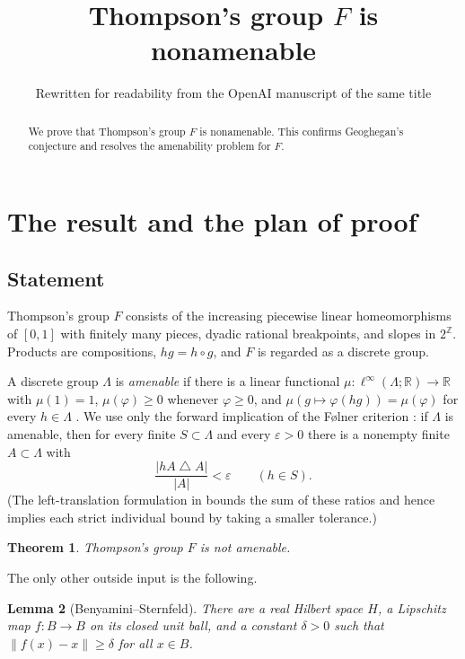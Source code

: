 \documentclass[11pt]{article}
\title{Thompson's group \(F\) is nonamenable}
\author{Rewritten for readability from the OpenAI manuscript of the same title}
\date{}
\newcommand{\R}{\mathbb R}
\newcommand{\Z}{\mathbb Z}
\newcommand{\norm}[1]{\lVert #1\rVert}
\newtheorem{theorem}{Theorem}[section]
\newtheorem{lemma}[theorem]{Lemma}
\theoremstyle{definition}
\numberwithin{equation}{section}
\begin{document}
\maketitle
\begin{abstract}
We prove that Thompson's group \(F\) is nonamenable. This confirms
Geoghegan's conjecture and resolves the amenability problem for \(F\).
\end{abstract}

\section{The result and the plan of proof}\label{sec:introduction}

\subsection{Statement}

Thompson's group $F$ consists of the increasing piecewise linear
homeomorphisms of $[0,1]$ with finitely many pieces, dyadic rational
breakpoints, and slopes in $2^{\Z}$. Products are compositions,
$hg=h\circ g$, and $F$ is regarded as a discrete group.

A discrete group $\Lambda$ is \emph{amenable} if there is a linear
functional $\mu:\ell^\infty(\Lambda;\R)\to\R$ with $\mu(1)=1$,
$\mu(\varphi)\ge0$ whenever $\varphi\ge0$, and
$\mu(g\mapsto\varphi(hg))=\mu(\varphi)$ for every $h\in\Lambda$
\cite{vonNeumann1929,Day1957}. We use only the forward implication of
the F\o lner criterion \cite{Folner1955}: if $\Lambda$ is amenable, then
for every finite $S\subset\Lambda$ and every $\varepsilon>0$ there is a
nonempty finite $A\subset\Lambda$ with
\begin{equation}\label{eq:folner}
  \frac{|hA\mathbin{\triangle}A|}{|A|}<\varepsilon\qquad(h\in S).
\end{equation}
(The left-translation formulation in \cite[Theorem~1.2]{Moore2013}
bounds the sum of these ratios and hence implies each strict individual
bound by taking a smaller tolerance.)

\begin{theorem}\label{thm:main}
Thompson's group \(F\) is not amenable.
\end{theorem}

The only other outside input is the following.

\begin{lemma}[Benyamini--Sternfeld]\label{lem:displacement}
There are a real Hilbert space \(H\), a Lipschitz map \(f:B\to B\) on its
closed unit ball, and a constant \(\delta>0\) such that
\(\norm{f(x)-x}\ge\delta\) for all \(x\in B\).
\end{lemma}
\end{document}
